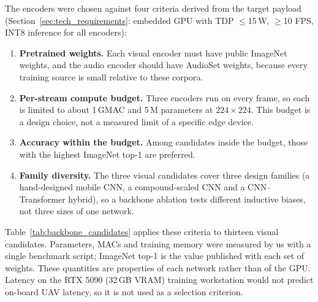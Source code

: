 The encoders were chosen against four criteria derived from the target payload (Section~\ref{sec:tech_requirements}: embedded GPU with TDP $\leq$15\,W, $\geq$10 FPS, INT8 inference for all encoders):
\begin{enumerate}
    \item \textbf{Pretrained weights.} Each visual encoder must have public ImageNet weights, and the audio encoder should have AudioSet weights, because every training source is small relative to these corpora.
    \item \textbf{Per-stream compute budget.} Three encoders run on every frame, so each is limited to about 1\,GMAC and 5\,M parameters at $224\times224$. This budget is a design choice, not a measured limit of a specific edge device.
    \item \textbf{Accuracy within the budget.} Among candidates inside the budget, those with the highest ImageNet top-1 are preferred.
    \item \textbf{Family diversity.} The three visual candidates cover three design families (a hand-designed mobile CNN, a compound-scaled CNN and a CNN--Transformer hybrid), so a backbone ablation tests different inductive biases, not three sizes of one network.
\end{enumerate}

Table~\ref{tab:backbone_candidates} applies these criteria to thirteen visual candidates. Parameters, MACs and training memory were measured by us with a single benchmark script; ImageNet top-1 is the value published with each set of weights. These quantities are properties of each network rather than of the GPU. Latency on the RTX 5090 (32\,GB VRAM) training workstation would not predict on-board UAV latency, so it is not used as a selection criterion.


